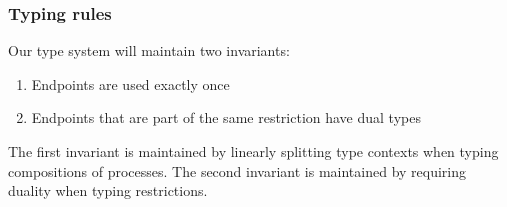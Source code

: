 \subsubsection{Typing rules}
Our type system will maintain two invariants:
\begin{enumerate}
\item Endpoints are used exactly once
\item Endpoints that are part of the same restriction have dual types
\end{enumerate}
The first invariant is maintained by linearly splitting type contexts when typing compositions of processes.
The second invariant is maintained by requiring duality when typing restrictions.






